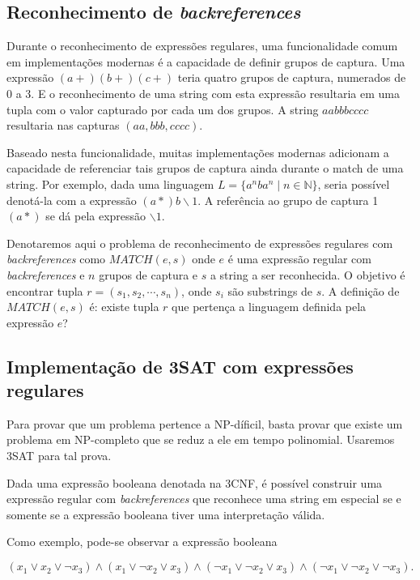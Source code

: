\documentclass[a4paper,12pt,oneside,onecolumn]{uerj}
\begin{document}
\subsection{Reconhecimento de \emph{backreferences}}

Durante o reconhecimento de expressões regulares, uma funcionalidade comum em implementações modernas é a capacidade de definir grupos de captura. Uma expressão $(a+)(b+)(c+)$ teria quatro grupos de captura, numerados de 0 a 3. E o reconhecimento de uma string com esta expressão resultaria em uma tupla com o valor capturado por cada um dos grupos. A string $aabbbcccc$ resultaria nas capturas $(aa, bbb, cccc)$.

Baseado nesta funcionalidade, muitas implementações modernas adicionam a capacidade de referenciar tais grupos de captura ainda durante o match de uma string. Por exemplo, dada uma linguagem $L = \{a^nba^n \mid n \in \mathbb{N}\}$, seria possível denotá-la com a expressão $(a*)b \backslash 1$. A referência ao grupo de captura 1 $(a*)$ se dá pela expressão $\backslash 1$.

Denotaremos aqui o problema de reconhecimento de expressões regulares com \emph{backreferences} como $MATCH(e, s)$ onde $e$ é uma expressão regular com \emph{backreferences} e $n$ grupos de captura e $s$ a string a ser reconhecida. O objetivo é encontrar tupla $r = (s_1, s_2, \cdots, s_n)$, onde $s_i$ são substrings de $s$. A definição de $MATCH(e, s)$ é: existe tupla $r$ que pertença a linguagem definida pela expressão $e$?

\subsection{Implementação de 3SAT com expressões regulares}

Para provar que um problema pertence a NP-díficil, basta provar que existe um problema em NP-completo que se reduz a ele em tempo polinomial. Usaremos 3SAT para tal prova.

Dada uma expressão booleana denotada na 3CNF, é possível construir uma expressão regular com \emph{backreferences} que reconhece uma string em especial se e somente se a expressão booleana tiver uma interpretação válida.

Como exemplo, pode-se observar a expressão booleana

\setlength\abovedisplayskip{0pt}
\begin{equation*}
(x_1 \lor x_2 \lor \neg x_3) \wedge 
(x_1 \lor \neg x_2 \lor x_3) \wedge
(\neg x_1 \lor \neg x_2 \lor x_3) \wedge 
(\neg x_1 \lor \neg x_2 \lor \neg x_3).
\end{equation*}
\end{document}
